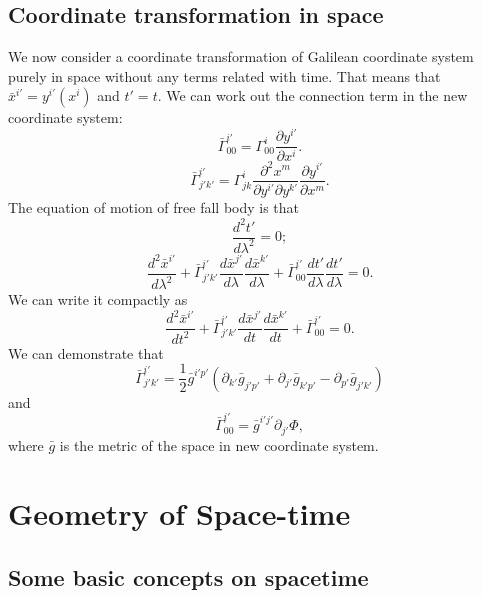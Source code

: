 \section{Coordinate transformation in space}
\noindent
We now consider a coordinate transformation of Galilean coordinate system purely in space without any terms related with time. That means that $\bar{x}^{i'} = y^{i'}(x^{i})$ and $t'=t$. We can work out the connection term in the new coordinate system:
\[\bar{\Gamma}^{i'}_{00} = \Gamma^{i}_{00} \frac{\partial y^{i'}}{\partial x^{i}}.\]
\[\bar{\Gamma}^{i'}_{j'k'} = \Gamma^{i}_{jk} \frac{\partial^2 x^{m}}{\partial y^{i'}\partial y^{k'}} \frac{\partial y^{i'}}{\partial x^{m}}.\]
The equation of motion of free fall body is that
\[\frac{d^2 t'}{d\lambda^2} = 0;\]
\[\frac{d^2 \bar{x}^{i'}}{d\lambda^2} + \bar{\Gamma}^{i'}_{j' k'} \frac{d\bar{x}^{j'}}{d \lambda} \frac{d\bar{x}^{k'}}{d \lambda} + \bar{\Gamma}^{i'}_{0 0} \frac{dt'}{d \lambda} \frac{dt'}{d \lambda}=0.\]
We can write it compactly as 
\[\frac{d^2 \bar{x}^{i'}}{dt^2} + \bar{\Gamma}^{i'}_{j' k'} \frac{d\bar{x}^{j'}}{dt} \frac{d\bar{x}^{k'}}{dt} + \bar{\Gamma}^{i'}_{0 0}=0.\]
We can demonstrate that
\[\bar{\Gamma}^{i'}_{j'k'} = \frac{1}{2} \bar{g}^{i'p'}(\partial_{k'}\bar{g}_{j'p'}+ \partial_{j'}\bar{g}_{k'p'}-\partial_{p'}\bar{g}_{j'k'}) \]
and
\[\bar{\Gamma}^{i'}_{00} = \bar{g}^{i'j'}\partial_{j'}\Phi, \]
where $\bar{g}$ is the metric of the space in new coordinate system.

\chapter{Geometry of Space-time}
\section{Some basic concepts on spacetime}
